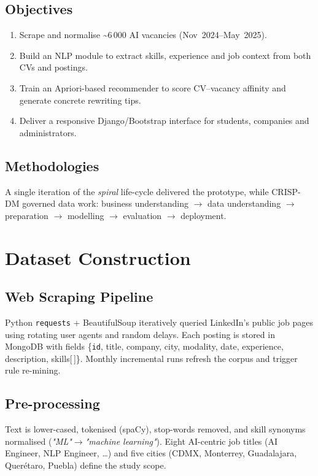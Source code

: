 \documentclass[12pt,a4paper]{article}
\begin{document}
	\subsection{Objectives}
	\begin{enumerate}[label=\alph*)]
		\item Scrape and normalise \textasciitilde6\,000 AI vacancies (Nov~2024–May~2025).
		\item Build an NLP module to extract skills, experience and job context from both CVs and postings.
		\item Train an Apriori-based recommender to score CV–vacancy affinity and generate concrete rewriting tips.
		\item Deliver a responsive Django/Bootstrap interface for students, companies and administrators.
	\end{enumerate}
	
	\subsection{Methodologies}
	A single iteration of the \emph{spiral} life-cycle delivered the prototype, while CRISP-DM governed data work: business understanding $\rightarrow$ data understanding $\rightarrow$ preparation $\rightarrow$ modelling $\rightarrow$ evaluation $\rightarrow$ deployment.
	
	\section{Dataset Construction}
	\subsection{Web Scraping Pipeline}
	Python \texttt{requests} + BeautifulSoup iteratively queried LinkedIn’s public job pages using rotating user agents and random delays. Each posting is stored in MongoDB with fields \{\texttt{id}, title, company, city, modality, date, experience, description, skills[\,]\}. Monthly incremental runs refresh the corpus and trigger rule re-mining.
	
	\subsection{Pre-processing}
	Text is lower-cased, tokenised (spaCy), stop-words removed, and skill synonyms normalised (\emph{"ML"}$\to$\emph{"machine learning"}). Eight AI-centric job titles (AI Engineer, NLP Engineer, \dots) and five cities (CDMX, Monterrey, Guadalajara, Querétaro, Puebla) define the study scope.
	
\end{document}
